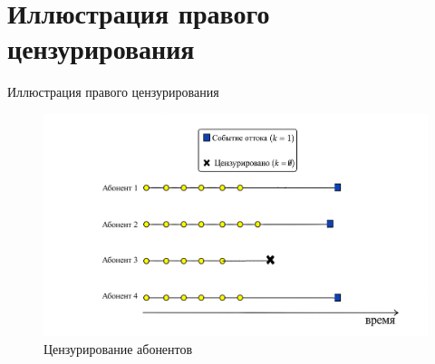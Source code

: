 \documentclass[10pt,pdf,hyperref={unicode}]{beamer}
\renewcommand{\figurename}{}{}%
\renewcommand{\figurename}{\relax}%
\begin{document}
\section{Иллюстрация правого цензурирования}
\begin{frame}{Иллюстрация правого цензурирования}



\begin{figure}[h!]
	\centering
	\begin{minipage}{1\textwidth}
		\centering
		\includegraphics[width=0.9\linewidth]{../figures/survival_example.png}
		\renewcommand{\figurename}{}{}%
		\caption{Цензурирование абонентов}
	\end{minipage}

\end{figure}

\end{frame}
\end{document}
